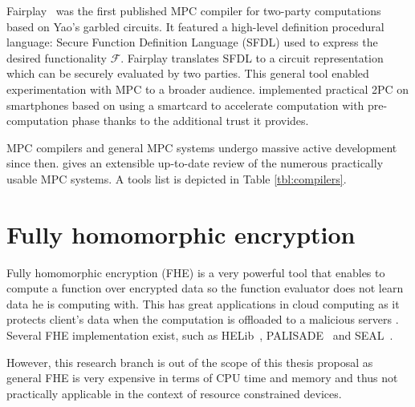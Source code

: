 \documentclass[
  digital, %
  twoside, %
  table,   %
  lof,     %
  lot,     %
]{fithesis3}
\newcounter{ph4_show_guides}
\theoremstyle{definition}
\theoremstyle{remark}
\begin{document}
Fairplay~\cite{MNPS04} was the first published MPC compiler for two-party computations based on Yao's garbled circuits. It featured a high-level definition procedural language: Secure Function Definition Language (SFDL) used to express the desired functionality $\mathcal{F}$. Fairplay translates SFDL to a circuit representation which can be securely evaluated by two parties. This general tool enabled experimentation with MPC to a broader audience. \cite{DSZ14} implemented practical 2PC on smartphones based on \cite{GMW87} using a smartcard to accelerate computation with pre-computation phase thanks to the additional trust it provides.

MPC compilers and general MPC systems undergo massive active development since then. \cite{sok19} gives an extensible up-to-date review of the numerous practically usable MPC systems. A tools list is depicted in Table \ref{tbl:compilers}. %


\section{Fully homomorphic encryption}\label{sec:soa:fhe}
Fully homomorphic encryption (FHE) is a very powerful tool that enables to compute a function over encrypted data so the function evaluator does not learn data he is computing with. This has great applications in cloud computing as it protects client's data when the computation is offloaded to a malicious servers \cite{Gentry:2009:FHE:1536414.1536440, 10.1007/978-3-642-13190-5_2, cryptoeprint:2011:133, cryptoeprint:2012:099, 10.1007/978-3-642-40041-4_5, 10.1007/978-3-642-36362-7_1, 10.1007/978-3-642-55220-5_30}. 
Several FHE implementation exist, such as HELib~\cite{helib}, PALISADE~\cite{palisade} and SEAL~\cite{seal}.

However, this research branch is out of the scope of this thesis proposal as general FHE is very expensive in terms of CPU time and memory and thus not practically applicable in the context of resource constrained devices.
\end{document}
